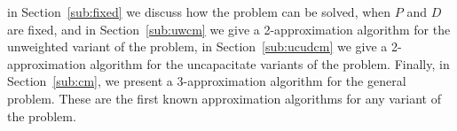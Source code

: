 in Section~\ref{sub:fixed} we discuss how the problem can be solved,
when $P$ and $D$ are fixed,
and in Section~\ref{sub:uwcm} we give a 2-approximation algorithm for the
unweighted variant of the problem,
in Section~\ref{sub:ucudcm} we give a 2-approximation algorithm
for the uncapacitate variants of the problem. 
Finally, in Section~\ref{sub:cm}, we present a 3-approximation
algorithm for the general problem. 
These are the first known approximation algorithms for any variant of the problem.
